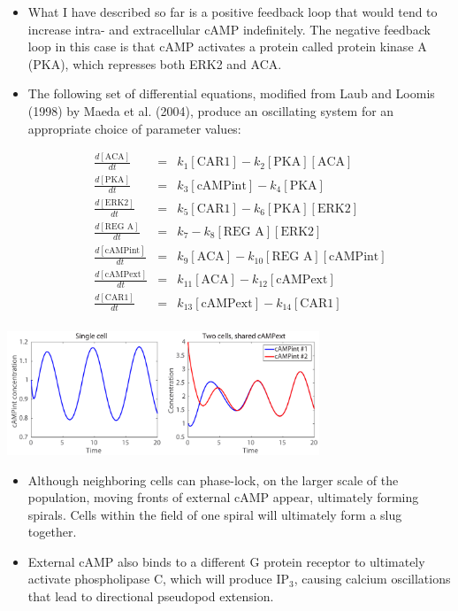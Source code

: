 \documentclass{article}
\begin{document}
\begin{itemize}
\item What I have described so far is a positive feedback loop that would tend to increase intra- and extracellular cAMP indefinitely. The negative feedback loop in this case is that cAMP activates a protein called protein kinase A (PKA), which represses both ERK2 and ACA.
\item The following set of differential equations, modified from Laub and Loomis (1998) by Maeda et al. (2004), produce an oscillating system for an appropriate choice of parameter values:

\begin{eqnarray*}
\frac{d [\textrm{ACA}]}{dt} & = & k_1  [\textrm{CAR1}] - k_2 [\textrm{PKA}]  [\textrm{ACA}]\\
\frac{d [\textrm{PKA}]}{dt} & = & k_3  [\textrm{cAMPint}] - k_4 [\textrm{PKA}] \\
\frac{d[ \textrm{ERK2}]}{dt} & = & k_5  [\textrm{CAR1}] - k_6 [\textrm{PKA}]  [\textrm{ERK2}]\\
\frac{d [\textrm{REG A}]}{dt} & = & k_7  - k_8 [\textrm{REG A}]  [\textrm{ERK2}]\\
\frac{d [\textrm{cAMPint}]}{dt} & = & k_9  [\textrm{ACA}] - k_{10} [\textrm{REG A}] [\textrm{cAMPint}]\\
\frac{d[ \textrm{cAMPext}]}{dt} & = & k_{11}  [\textrm{ACA}] - k_{12}  [\textrm{cAMPext}]\\
\frac{d [\textrm{CAR1}]}{dt} & = & k_{13}  [\textrm{cAMPext}]  - k_{14} [\textrm{CAR1}] \\
\end{eqnarray*}

\end{itemize}

\begin{center}
\includegraphics[width=0.7\textwidth]{slime.pdf}
\end{center}

\begin{itemize}

\item Although neighboring cells can phase-lock, on the larger scale of the population, moving fronts of external cAMP appear, ultimately forming spirals. Cells within the field of one spiral will ultimately form a slug together.
\item External cAMP also binds to a different G protein receptor to ultimately activate phospholipase C, which will produce IP$_3$, causing calcium oscillations that lead to directional pseudopod extension.
\end{itemize}
\end{document}
